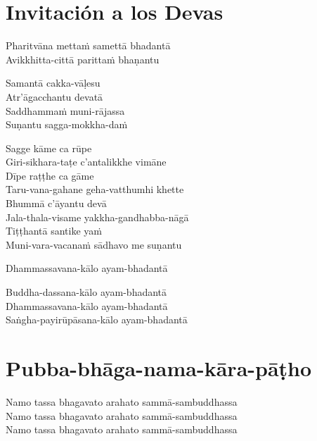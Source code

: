 \chapter{Invitación a los Devas}


\begin{paritta}
%
Pharitvāna mettaṁ samettā bhadantā\\
Avikkhitta-cittā parittaṁ bhaṇantu

%
Samantā cakka-vāḷesu\\
Atr'āgacchantu devatā\\
Saddhammaṁ muni-rājassa\\
Suṇantu sagga-mokkha-daṁ

Sagge kāme ca rūpe\\
Giri-sikhara-taṭe c'antalikkhe vimāne\\
Dīpe raṭṭhe ca gāme\\
Taru-vana-gahane geha-vatthumhi khette\\
Bhummā c'āyantu devā\\
Jala-thala-visame yakkha-gandhabba-nāgā\\
Tiṭṭhantā santike yaṁ\\
Muni-vara-vacanaṁ sādhavo me suṇantu

Dhammassavana-kālo ayam-bhadantā


Buddha-dassana-kālo ayam-bhadantā\\
Dhammassavana-kālo ayam-bhadantā\\
Saṅgha-payirūpāsana-kālo ayam-bhadantā
\end{paritta}

\clearpage

\chapter{Pubba-bhāga-nama-kāra-pāṭho}


\begin{paritta}
Namo tassa bhagavato arahato sammā-sambuddhassa\\
Namo tassa bhagavato arahato sammā-sambuddhassa\\
Namo tassa bhagavato arahato sammā-sambuddhassa
\end{paritta}


